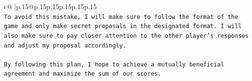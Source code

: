 \documentclass{article}
\begin{document}
{\begin{supertabular}{c@{$\;$}|p{.15\linewidth}@{}p{.15\linewidth}p{.15\linewidth}p{.15\linewidth}p{.15\linewidth}p{.15\linewidth}}
{{{\\ 
\texttt{To avoid this mistake, I will make sure to follow the format of the game and only make secret proposals in the designated format. I will also make sure to pay closer attention to the other player's responses and adjust my proposal accordingly.} \\
\\ 
\texttt{By following this plan, I hope to achieve a mutually beneficial agreement and maximize the sum of our scores.} \\
            }
        }
    }
     \\ \\

\end{supertabular}
}
\end{document}
